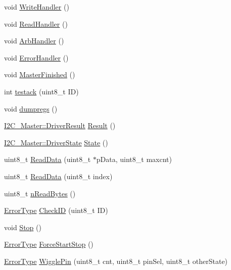 \begin{DoxyCompactItemize}
\item 
void \hyperlink{class_i2_c___master_a6f98d7fb1d99f496e839e5d5f3c319d0}{WriteHandler} ()
\item 
void \hyperlink{class_i2_c___master_ae1bd396452977a2edb841fa6f84919a7}{ReadHandler} ()
\item 
void \hyperlink{class_i2_c___master_a83f7567e7c6b76c022b780e96396a844}{ArbHandler} ()
\item 
void \hyperlink{class_i2_c___master_a242358ce8f170a38db3624ac55c6510f}{ErrorHandler} ()
\item 
void \hyperlink{class_i2_c___master_aa311bbb226b4c52c52ff87de83d601ee}{MasterFinished} ()
\item 
int \hyperlink{class_i2_c___master_a3dc61a8ad5256ce3aa7219553cbf2f5f}{testack} (uint8\_\-t ID)
\item 
void \hyperlink{class_i2_c___master_a7f45b6d95a4d67b5da5ae81173cf2210}{dumpregs} ()
\item 
\hyperlink{class_i2_c___master_aff65d5186eee9d33563619432439cb53}{I2C\_\-Master::DriverResult} \hyperlink{class_i2_c___master_a24bc6480db778c51e2e1abbacac57a20}{Result} ()
\item 
\hyperlink{class_i2_c___master_aaa6720f57770cfe755cb3d6dfc665cfa}{I2C\_\-Master::DriverState} \hyperlink{class_i2_c___master_a386dc5886d43b456fae8fa0457ad0fa6}{State} ()
\item 
uint8\_\-t \hyperlink{class_i2_c___master_ab7c8dd50c0e931fb20a73e42b2c2202a}{ReadData} (uint8\_\-t $\ast$pData, uint8\_\-t maxcnt)
\item 
uint8\_\-t \hyperlink{class_i2_c___master_a80cb8c3fd55735eea7dbfc90ad7ef5a4}{ReadData} (uint8\_\-t index)
\item 
uint8\_\-t \hyperlink{class_i2_c___master_a62531dd810c1e96ae92657feb6c74bef}{nReadBytes} ()
\item 
\hyperlink{class_i2_c___master_abdfca5f4be266d6d15163ea41e216a57}{ErrorType} \hyperlink{class_i2_c___master_af2e8e8d92ff48f91ee5395c0e34a2724}{CheckID} (uint8\_\-t ID)
\item 
void \hyperlink{class_i2_c___master_a0e878755be5246de239e897cf60be401}{Stop} ()
\item 
\hyperlink{class_i2_c___master_abdfca5f4be266d6d15163ea41e216a57}{ErrorType} \hyperlink{class_i2_c___master_a08749ea515583e38c5bfb0e50751a0ec}{ForceStartStop} ()
\item 
\hyperlink{class_i2_c___master_abdfca5f4be266d6d15163ea41e216a57}{ErrorType} \hyperlink{class_i2_c___master_a78ebdbf58c7a0ee05bdca47349dee54a}{WigglePin} (uint8\_\-t cnt, uint8\_\-t pinSel, uint8\_\-t otherState)

\end{DoxyCompactItemize}
